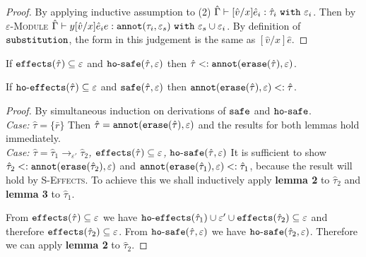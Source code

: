 \begin{appendix}
\begin{proof}
By applying inductive assumption to (2) $\hat \Gamma \vdash [\hat v/x]\hat e_i: \hat \tau_i~\mathtt{with}~ \varepsilon_i$.
 Then by \textsc{$\varepsilon$-Module} $\hat \Gamma \vdash {y}{[\hat v/x]\hat e_i}{e}: \mathtt{annot}(\tau_i, \varepsilon_s)~\mathtt{with}~ \varepsilon_s \cup \varepsilon_i$. By definition of $\mathtt{substitution}$, the form in this judgement is the same as $[\hat v/x]\hat e$.
\end{proof}


















\hrulefill

\begin{lemma}
If $\mathtt{effects}(\hat \tau) \subseteq \varepsilon$ and $\mathtt{ho \hbox{-} safe}(\hat \tau, \varepsilon)$ then $\hat \tau <: \mathtt{annot}(\mathtt{erase}(\hat \tau), \varepsilon)$.
\end{lemma}

\begin{lemma}
If $\mathtt{ho \hbox{-} effects}(\hat \tau) \subseteq \varepsilon$ and $\mathtt{safe}(\hat \tau, \varepsilon)$ then $\mathtt{annot(erase}(\hat \tau), \varepsilon) <: \hat \tau$.
\end{lemma}

\begin{proof}
By simultaneous induction on derivations of $\mathtt{safe}$ and $\mathtt{ho \hbox{-} safe}$.\\

\textit{Case:} $\hat \tau = \{ \bar r \}$ Then $\hat \tau = \mathtt{annot(erase}(\hat \tau), \varepsilon)$ and the results for both lemmas hold immediately. \\

\textit{Case: $\hat \tau = \hat \tau_1 \rightarrow_{\varepsilon'} \hat \tau_2$, $\mathtt{effects}(\hat \tau) \subseteq \varepsilon$, $\mathtt{ho \hbox{-} safe}(\hat \tau, \varepsilon)$} It is sufficient to show $\hat \tau_2 <: \mathtt{annot(erase}(\hat \tau_2), \varepsilon)$ and $\mathtt{annot(erase}(\hat \tau_1), \varepsilon) <: \hat \tau_1$, because the result will hold by \textsc{S-Effects}. To achieve this we shall inductively apply \textbf{lemma 2} to $\hat \tau_2$ and \textbf{lemma 3} to $\hat \tau_1$. 

From $\mathtt{effects}(\hat \tau) \subseteq \varepsilon$ we have $\mathtt{ho \hbox{-} effects}(\hat \tau_1) \cup \varepsilon' \cup \mathtt{effects}(\hat \tau_2) \subseteq \varepsilon$ and therefore $\mathtt{effects}(\hat \tau_2) \subseteq \varepsilon$. From $\mathtt{ho \hbox{-} safe}(\hat \tau, \varepsilon)$ we have $\mathtt{ho \hbox{-} safe}(\hat \tau_2, \varepsilon)$. Therefore we can apply \textbf{lemma 2} to $\hat \tau_2$.


\end{proof}
\end{appendix}
